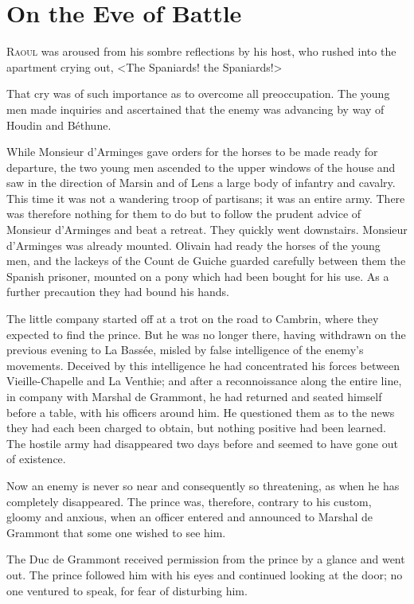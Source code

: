 \chapter{On the Eve of Battle}

 \lettrine{R}{aoul} was aroused from his sombre reflections by his host, who rushed into the apartment crying out, <The Spaniards! the Spaniards!>

\zz
That cry was of such importance as to overcome all preoccupation. The young men made inquiries and ascertained that the enemy was advancing by way of Houdin and Béthune.

While Monsieur d'Arminges gave orders for the horses to be made ready for departure, the two young men ascended to the upper windows of the house and saw in the direction of Marsin and of Lens a large body of infantry and cavalry. This time it was not a wandering troop of partisans; it was an entire army. There was therefore nothing for them to do but to follow the prudent advice of Monsieur d'Arminges and beat a retreat. They quickly went downstairs. Monsieur d'Arminges was already mounted. Olivain had ready the horses of the young men, and the lackeys of the Count de Guiche guarded carefully between them the Spanish prisoner, mounted on a pony which had been bought for his use. As a further precaution they had bound his hands.

The little company started off at a trot on the road to Cambrin, where they expected to find the prince. But he was no longer there, having withdrawn on the previous evening to La Bassée, misled by false intelligence of the enemy's movements. Deceived by this intelligence he had concentrated his forces between Vieille-Chapelle and La Venthie; and after a reconnoissance along the entire line, in company with Marshal de Grammont, he had returned and seated himself before a table, with his officers around him. He questioned them as to the news they had each been charged to obtain, but nothing positive had been learned. The hostile army had disappeared two days before and seemed to have gone out of existence.

Now an enemy is never so near and consequently so threatening, as when he has completely disappeared. The prince was, therefore, contrary to his custom, gloomy and anxious, when an officer entered and announced to Marshal de Grammont that some one wished to see him.

The Duc de Grammont received permission from the prince by a glance and went out. The prince followed him with his eyes and continued looking at the door; no one ventured to speak, for fear of disturbing him.


